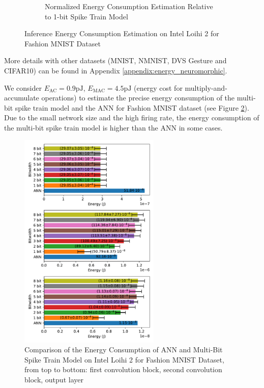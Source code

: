 \begin{figure}[!htpb]
\begin{subfigure}[H]{0.48\textwidth}
                \caption{Normalized Energy Consumption Estimation Relative to 1-bit Spike Train Model}
            \end{subfigure}
            \caption{Inference Energy Consumption Estimation on Intel Loihi 2 for Fashion MNIST Dataset}
            \label{fig:inference_energy_nh}
        \end{figure}

        More details with other datasets (MNIST, NMNIST, DVS Gesture and CIFAR10) can be found in Appendix \ref{appendix:energy_neuromorphic}.

        We consider $E_{\text{AC}}=0.9\text{pJ}$, $E_{\text{MAC}}=4.5\text{pJ}$ (energy cost for multiply-and-accumulate operations) \cite{6757323} to estimate the precise energy consumption of the multi-bit spike train model and the ANN for Fashion MNIST dataset (see Figure \ref{fig:energy_ann_vs_snn}). Due to the small network size and the high firing rate, the energy consumption of the multi-bit spike train model is higher than the ANN in some cases.
        \begin{figure}[!htpb]
            \centering
            \includegraphics[width=0.6\textwidth]{../standard/FashionMNIST/plots/fashionmnist_energy_ann_vs_snn.pdf}
            \caption{Comparison of the Energy Consumption of ANN and Multi-Bit Spike Train Model on Intel Loihi 2 for Fashion MNIST Dataset, from top to bottom: first convolution block, second convolution block, output layer}
            \label{fig:energy_ann_vs_snn}
        \end{figure}

